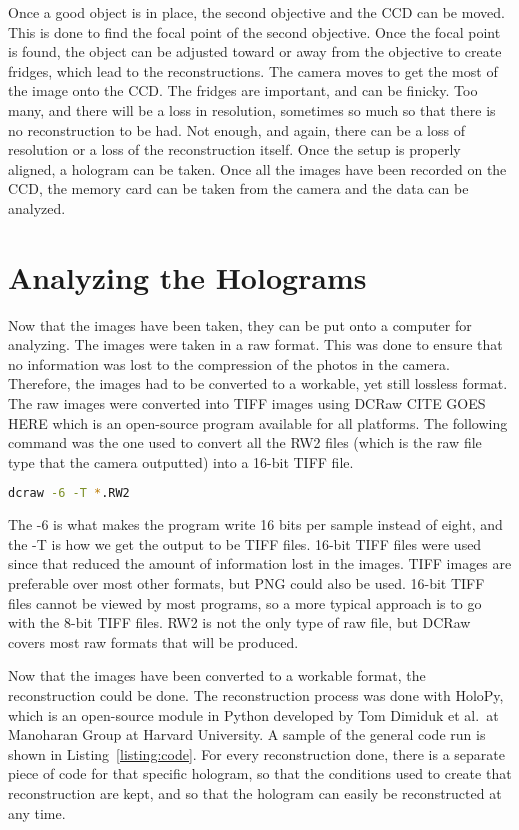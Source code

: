 Once a good object
is in place, the second objective and the CCD can be moved. This is done to
find the focal point of the second objective. Once the focal point is found,
the object can be adjusted toward or away from the objective to create fridges,
which lead to the reconstructions. The camera moves to get the most of the
image onto the CCD\@. The fridges are important, and can be finicky. Too many,
and there will be a loss in resolution, sometimes so much so that there is no
reconstruction to be had. Not enough, and again, there can be a loss of
resolution or a loss of the reconstruction itself. Once the setup is properly
aligned, a hologram can be taken. Once all the images have been recorded on the
CCD, the memory card can be taken from the camera and the data can be analyzed.

\section{Analyzing the Holograms}

Now that the images have been taken, they can be put onto a computer for
analyzing. The images were taken in a raw format. This was done to ensure that
no information was lost to the compression of the photos in the camera.
Therefore, the images had to be converted to a workable, yet still lossless
format. The raw images were converted into TIFF images using DCRaw%
CITE GOES HERE
which is an
open-source program available for all platforms. The following command was the
one used to convert all the RW2 files (which is the raw file type that the
camera outputted) into a 16-bit TIFF file.

\begin{center}
\begin{lstlisting}[frame=none, language=bash, numbers=none]
dcraw -6 -T *.RW2
\end{lstlisting}
\end{center}
The -6 is what makes the program write 16 bits per sample instead of eight, and
the -T is how we get the output to be TIFF files. 16-bit TIFF files were used
since that reduced the amount of information lost in the images. TIFF images
are preferable over most other formats, but PNG could also be used. 16-bit TIFF
files cannot be viewed by most programs, so a more typical approach is to go
with the 8-bit TIFF files. RW2 is not the only type of raw
file, but DCRaw covers most raw formats that will be produced.

Now that the images have been converted to a workable format, the
reconstruction could be done. The reconstruction process was done with HoloPy,
which is an open-source module in Python developed by Tom Dimiduk et al.\ at Manoharan Group at
Harvard University. A sample of the general code run is shown in
Listing~\ref{listing:code}. For every reconstruction done, there is a separate
piece of code for that specific hologram, so that the conditions used to create
that reconstruction are kept, and so that the hologram can easily be
reconstructed at any time.


